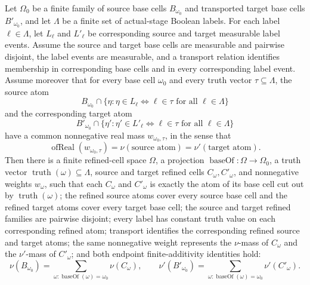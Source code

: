 \begin{helper}
Let \(\Omega_0\) be a finite family of source base cells
\(B_{\omega_0}\) and transported target base cells \(B'_{\omega_0}\), and
let \(\Lambda\) be a finite set of actual-stage Boolean labels.  For each
label \(\ell\in\Lambda\), let \(L_\ell\) and \(L'_\ell\) be corresponding
source and target measurable label events.  Assume the source and target base
cells are measurable and pairwise disjoint, the label events are measurable,
and a transport relation identifies membership in corresponding base cells and
in every corresponding label event.  Assume moreover that for every base cell
\(\omega_0\) and every truth vector \(\tau\subseteq\Lambda\), the source atom
\[
B_{\omega_0}\cap\{ \eta : \eta\in L_\ell \Longleftrightarrow \ell\in\tau
\text{ for all }\ell\in\Lambda\}
\]
and the corresponding target atom
\[
B'_{\omega_0}\cap\{ \eta' : \eta'\in L'_\ell \Longleftrightarrow \ell\in\tau
\text{ for all }\ell\in\Lambda\}
\]
have a common nonnegative real mass \(w_{\omega_0,\tau}\), in the sense that
\[
\operatorname{ofReal}(w_{\omega_0,\tau})
=\nu(\text{source atom})
=\nu'(\text{target atom}).
\]
Then there is a finite refined-cell space \(\Omega\), a projection
\(\operatorname{baseOf}:\Omega\to\Omega_0\), a truth vector
\(\operatorname{truth}(\omega)\subseteq\Lambda\), source and target refined
cells \(C_\omega,C'_\omega\), and nonnegative weights \(w_\omega\), such that
each \(C_\omega\) and \(C'_\omega\) is exactly the atom of its base cell cut
out by \(\operatorname{truth}(\omega)\); the refined source atoms cover every
source base cell and the refined target atoms cover every target base cell;
the source and target refined families are pairwise disjoint; every label has
constant truth value on each corresponding refined atom; transport identifies
the corresponding refined source and target atoms; the same nonnegative
weight represents the \(\nu\)-mass of \(C_\omega\) and the \(\nu'\)-mass of
\(C'_\omega\); and both endpoint finite-additivity identities hold:
\[
\nu(B_{\omega_0})=\sum_{\omega:\operatorname{baseOf}(\omega)=\omega_0}
  \nu(C_\omega),\qquad
\nu'(B'_{\omega_0})=\sum_{\omega:\operatorname{baseOf}(\omega)=\omega_0}
  \nu'(C'_\omega).
\]
\end{helper}
